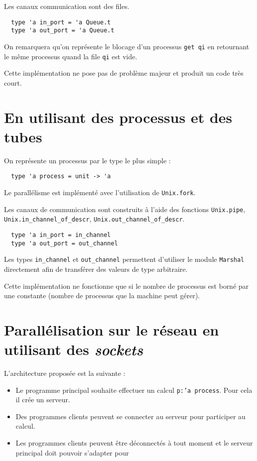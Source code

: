 \documentclass[11pt]{article}
\begin{document}
Les canaux communication sont des files.

\begin{lstlisting}
  type 'a in_port = 'a Queue.t
  type 'a out_port = 'a Queue.t
\end{lstlisting}

On remarquera qu'on repr\'esente le blocage d'un processus {\tt get qi}
en retournant le m\^eme processus quand la file {\tt qi} est vide.

\smallskip

Cette impl\'ementation ne pose pas de probl\`eme majeur
et produit un code tr\`es court.

\section{En utilisant des processus et des tubes}

On repr\'esente un processus par le type le plus simple :

\begin{lstlisting}
  type 'a process = unit -> 'a
\end{lstlisting}

Le parall\'elisme est impl\'ement\'e avec l'utilisation de {\tt Unix.fork}.

\smallskip

Les canaux de communication sont construits \`a l'aide des fonctions
{\tt Unix.pipe},
{\tt Unix.in\_channel\_of\_descr}, {\tt Unix.out\_channel\_of\_descr}.

\begin{lstlisting}
  type 'a in_port = in_channel
  type 'a out_port = out_channel
\end{lstlisting}

Les types {\tt in\_channel} et {\tt out\_channel} permettent d'utiliser
le module {\tt Marshal} directement afin de transf\'erer des valeurs
de type arbitraire.

\smallskip

Cette impl\'ementation ne fonctionne que si le nombre de processus est
born\'e par une constante (nombre de processus que la machine peut g\'erer).

\section{Parall\'elisation sur le r\'eseau en utilisant des {\sl sockets}}

L'architecture propos\'ee est la suivante :

\begin{itemize}
  \item Le programme principal souhaite effectuer un calcul
    {\tt p:'a process}. Pour cela il cr\'ee un serveur.
  \item Des programmes clients peuvent se connecter au serveur pour
    participer au calcul.
  \item Les programmes clients peuvent \^etre d\'econnect\'es \`a tout moment
    et le serveur principal doit pouvoir s'adapter pour 
\end{itemize}
\end{document}
